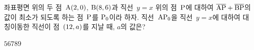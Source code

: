 좌표평면 위의 두 점~$\mathrm{A}(2{,}\mkern3mu 0)$, $\mathrm{B}(8{,}\mkern3mu 6)$과 직선~$y=x$ 위의 점~$\mathrm{P}$에 대하여 $\overline{\mathrm{AP}}+\overline{\mathrm{BP}}$의 값이 최소가 되도록 하는 점~$\mathrm{P}$를 $\mathrm{P_0}$이라 하자. 직선~$\mathrm{AP_0}$을 직선~$y=x$에 대하여 대칭이동한 직선이 점~$(12{,}\mkern3mu a)$를 지날 때, $a$의 값은?
\begin{choices32}{$5$}{$6$}{$7$}{$8$}{$9$}\end{choices32}
